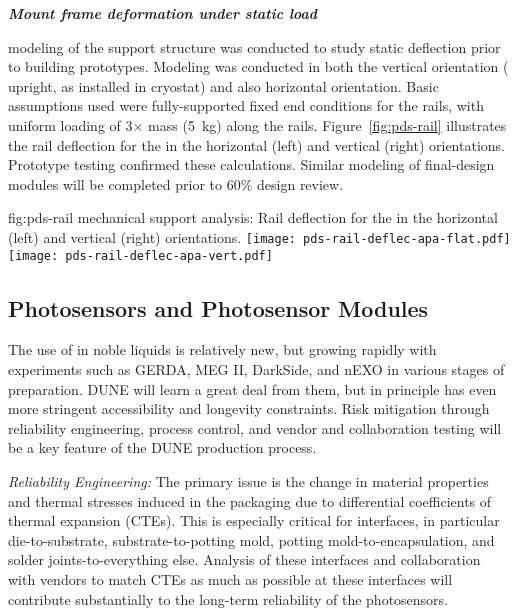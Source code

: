 \textit{\bf {} Mount frame deformation under static  load}


 modeling of the  support structure was conducted to study static deflection prior to building  prototypes.  Modeling was conducted in both the vertical orientation ( upright, as installed in cryostat) and also horizontal orientation.  
Basic assumptions used were fully-supported fixed end conditions for the rails, 
with uniform loading of 3$\times$  mass (\SI{5}{kg}) along the rails.  
Figure~\ref{fig:pds-rail} illustrates the rail deflection for the  in the horizontal (left) and vertical (right) orientations.
Prototype testing confirmed these calculations.  Similar modeling of final-design   modules will be completed prior to 60\% design review.


\begin{dunefigure}{fig:pds-rail}
{ mechanical support analysis: Rail deflection for the  in the horizontal (left) and vertical (right) orientations.}
	\texttt{[image: pds-rail-deflec-apa-flat.pdf]} 
	\texttt{[image: pds-rail-deflec-apa-vert.pdf]}\\
\end{dunefigure}


\subsection{Photosensors and Photosensor Modules}
\label{sec:fdsp-pd-assy-psm}

The use of  in noble liquids is relatively new, but growing rapidly with experiments such as GERDA, MEG II, DarkSide, and nEXO in various stages of preparation.
DUNE will learn a great deal from them, but in principle has even more stringent accessibility and longevity constraints. Risk mitigation through reliability engineering, process control, and vendor and collaboration testing will be a key feature of the DUNE  production process.

{\textit{Reliability Engineering:}} The primary issue is the change in material properties and thermal stresses induced in the packaging due to differential coefficients of thermal expansion (CTEs). This is especially critical for interfaces, in particular
die-to-substrate, substrate-to-potting mold, potting mold-to-encapsulation, and solder joints-to-everything else. Analysis of these interfaces and collaboration with vendors to match CTEs as much as possible at these interfaces will contribute substantially to the long-term reliability of the photosensors.

